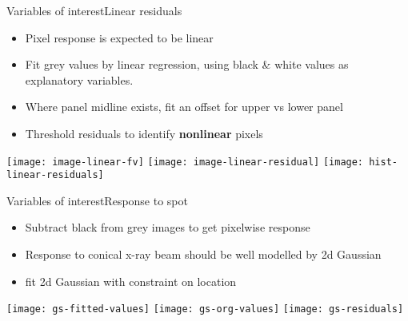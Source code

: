 \documentclass[8pt]{beamer}
\begin{document}
\begin{frame}{Variables of interest}{Linear residuals}
	\begin{itemize}
		\item Pixel response is expected to be linear 		%
		\item Fit grey values by linear regression, using black \& white values as explanatory variables. \\
		\item Where panel midline exists, fit an offset for upper vs lower panel
		\item Threshold residuals to identify \textbf{nonlinear} pixels
	\end{itemize}		

	\begin{center}
		\texttt{[image: image-linear-fv]}
		\texttt{[image: image-linear-residual]}
		\texttt{[image: hist-linear-residuals]}
	\end{center}
	
\end{frame}
	
	
\begin{frame}{Variables of interest}{Response to spot}
	\begin{itemize}
		\item Subtract black from grey images to get pixelwise response
		\item Response to conical x-ray beam should be well modelled by 2d Gaussian
		\item fit 2d Gaussian with constraint on location				%
	\end{itemize}
	
	\begin{center}
		\texttt{[image: gs-fitted-values]}
		\texttt{[image: gs-org-values]}			%
		\texttt{[image: gs-residuals]}
	\end{center}
	
\end{frame}		
		
\end{document}
